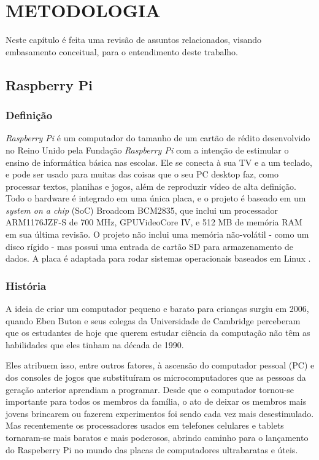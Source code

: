\chapter{METODOLOGIA}

Neste capítulo é feita uma revisão de assuntos relacionados, visando embasamento conceitual, para o entendimento deste trabalho.

\section{Raspberry Pi}

\subsection{Definição}

\textit{Raspberry Pi} é um computador do tamanho de um cartão de  rédito desenvolvido no Reino Unido pela Fundação \textit{Raspberry Pi} com a intenção de estimular o ensino de informática básica nas escolas. Ele se conecta à sua TV e a um teclado, e pode ser usado para muitas das coisas que o seu PC desktop faz, como processar textos, planihas e jogos, além de reproduzir vídeo de alta definição. Todo o hardware é integrado em uma única placa, e o projeto é baseado em um \textit{system on a chip} (SoC) Broadcom BCM2835, que inclui um processador ARM1176JZF-S de 700 MHz, GPUVideoCore IV, e 512 MB de memória RAM em sua última revisão. O projeto não inclui uma memória não-volátil - como um disco rígido - mas possui uma entrada de cartão SD para armazenamento de dados. A placa é adaptada para rodar sistemas operacionais baseados em Linux \cite{WIKIPEDIA2}.

\subsection{História}

A ideia de criar um computador pequeno e barato para crianças surgiu em 2006, quando Eben Buton e seus colegas da Universidade de Cambridge perceberam que os estudantes de hoje que querem estudar ciência da computação não têm as habilidades que eles tinham na década de 1990.

Eles atribuem isso, entre outros fatores, à ascensão do computador pessoal (PC) e dos consoles de jogos que substituíram os microcomputadores que as pessoas da geração anterior aprendiam a programar. Desde que o computador tornou-se importante para todos os membros da família, o ato de deixar os membros mais jovens brincarem ou fazerem experimentos foi sendo cada vez mais desestimulado.
Mas recentemente os processadores usados em telefones celulares e tablets tornaram-se mais baratos e mais poderosos, abrindo caminho para o lançamento do Raspeberry Pi no mundo das placas de computadores ultrabaratas e úteis.

